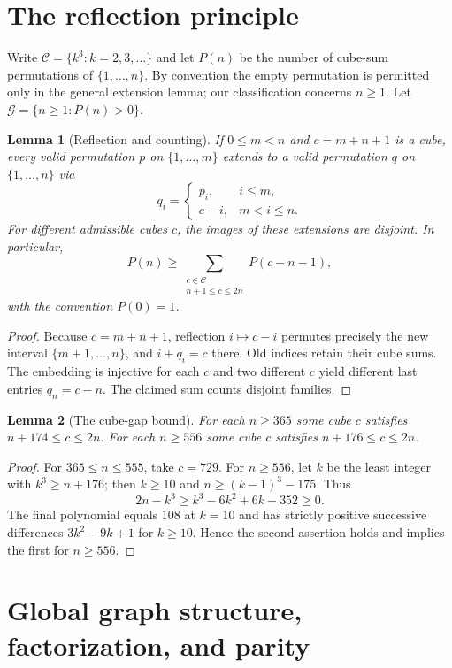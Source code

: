 \documentclass[10pt]{article}
\newtheorem{lemma}{Lemma}
\newcommand{\good}{\mathcal{G}}
\newcommand{\cubes}{\mathcal{C}}
\begin{document}
\section{The reflection principle}
Write $\cubes=\{k^3:k=2,3,\dots\}$ and let $P(n)$ be the
number of cube-sum permutations of $\{1,\dots,n\}$.
By convention the empty permutation is permitted only in the
general extension lemma; our classification concerns $n\ge1$.
Let $\good=\{n\ge1:P(n)>0\}$.

\begin{lemma}[Reflection and counting]\label{lem:reflect}
If $0\le m<n$ and $c=m+n+1$ is a cube, every valid
permutation $p$ on $\{1,\dots,m\}$ extends to a valid permutation
$q$ on $\{1,\dots,n\}$ via
\[
q_i=\begin{cases}
p_i,&i\le m,\\ c-i,&m<i\le n.
\end{cases}
\]
For different admissible cubes $c$, the images of these
extensions are disjoint. In particular,
\begin{equation}\label{eq:count}
P(n)\ge\!\!\!\!\sum_{\substack{c\in\cubes\\n+1\le c\le 2n}}
P(c-n-1),
\end{equation}
with the convention $P(0)=1$.
\end{lemma}
\begin{proof}
Because $c=m+n+1$, reflection $i\mapsto c-i$
permutes precisely the new interval $\{m+1,\dots,n\}$,
and $i+q_i=c$ there. Old indices retain their cube sums.
The embedding is injective for each $c$ and two different
$c$ yield different last entries $q_n=c-n$. The claimed
sum counts disjoint families.
\end{proof}

\begin{lemma}[The cube-gap bound]\label{lem:gap}
For each $n\ge365$ some cube $c$ satisfies
$n+174\le c\le2n$.
For each $n\ge556$ some cube $c$ satisfies
$n+176\le c\le2n$.
\end{lemma}
\begin{proof}
For $365\le n\le555$, take $c=729$.
For $n\ge556$, let $k$ be the least integer with
$k^3\ge n+176$; then $k\ge10$ and
$n\ge(k-1)^3-175$. Thus
\[
2n-k^3\ge k^3-6k^2+6k-352\ge0.
\]
The final polynomial equals $108$ at $k=10$ and
has strictly positive successive differences
$3k^2-9k+1$ for $k\ge10$.
Hence the second assertion holds and implies the first
for $n\ge556$.
\end{proof}

\section{Global graph structure, factorization, and parity}
\label{sec:graph}
\end{document}
